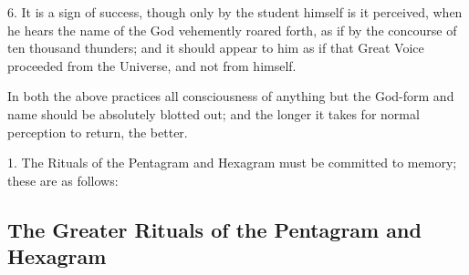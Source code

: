 6. It is a sign of success, though only by the student himself is it perceived, when he hears the name of the God vehemently roared forth, as if by the concourse of ten thousand thunders; and it should appear to him as if that Great Voice proceeded from the Universe, and not from himself.

In both the above practices all consciousness of anything but the God-form and name should be absolutely blotted out; and the longer it takes for normal perception to return, the better.



1. The Rituals of the Pentagram and Hexagram must be committed to memory; these are as follows:

\subsection*{The Greater Rituals of the Pentagram and Hexagram}

